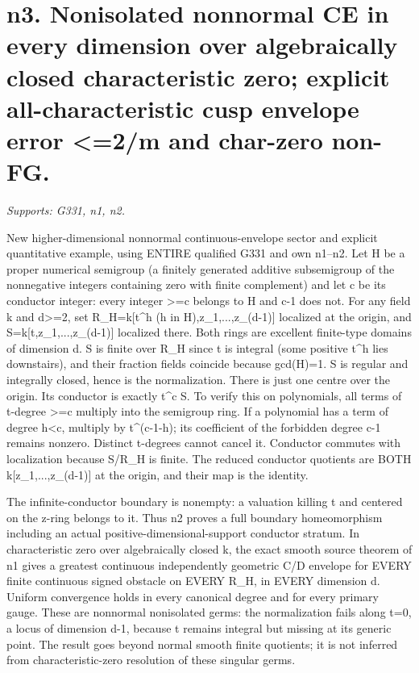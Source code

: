 \documentclass[11pt]{article}
\begin{document}
\section{n3. Nonisolated nonnormal CE in every dimension over algebraically closed characteristic zero; explicit all-characteristic cusp envelope error \textless{}=2/m and char-zero non-FG.}
\textit{Supports: G331, n1, n2.}

New higher-dimensional nonnormal continuous-envelope sector and explicit quantitative example, using ENTIRE qualified G331 and own n1--n2. Let H be a proper numerical semigroup (a finitely generated additive subsemigroup of the nonnegative integers containing zero with finite complement) and let c be its conductor integer: every integer \textgreater{}=c belongs to H and c-1 does not. For any field k and d\textgreater{}=2, set R\_H=k[t\textasciicircum{}h (h in H),z\_1,...,z\_(d-1)] localized at the origin, and S=k[t,z\_1,...,z\_(d-1)] localized there. Both rings are excellent finite-type domains of dimension d. S is finite over R\_H since t is integral (some positive t\textasciicircum{}h lies downstairs), and their fraction fields coincide because gcd(H)=1. S is regular and integrally closed, hence is the normalization. There is just one centre over the origin. Its conductor is exactly t\textasciicircum{}c S. To verify this on polynomials, all terms of t-degree \textgreater{}=c multiply into the semigroup ring. If a polynomial has a term of degree h\textless{}c, multiply by t\textasciicircum{}(c-1-h); its coefficient of the forbidden degree c-1 remains nonzero. Distinct t-degrees cannot cancel it. Conductor commutes with localization because S/R\_H is finite. The reduced conductor quotients are BOTH k[z\_1,...,z\_(d-1)] at the origin, and their map is the identity.

The infinite-conductor boundary is nonempty: a valuation killing t and centered on the z-ring belongs to it. Thus n2 proves a full boundary homeomorphism including an actual positive-dimensional-support conductor stratum. In characteristic zero over algebraically closed k, the exact smooth source theorem of n1 gives a greatest continuous independently geometric C/D envelope for EVERY finite continuous signed obstacle on EVERY R\_H, in EVERY dimension d. Uniform convergence holds in every canonical degree and for every primary gauge. These are nonnormal nonisolated germs: the normalization fails along t=0, a locus of dimension d-1, because t remains integral but missing at its generic point. The result goes beyond normal smooth finite quotients; it is not inferred from characteristic-zero resolution of these singular germs.
\end{document}
